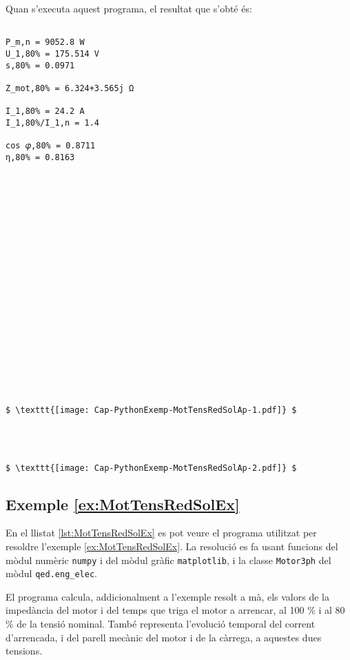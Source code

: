 Quan s'executa aquest programa, el resultat que s'obté és:
\lstset{
	language=,
	numbers=none,
	frame=none
}
\begin{lstlisting}[mathescape=true]
	
P_m,n = 9052.8 W
U_1,80% = 175.514 V
s,80% = 0.0971

Z_mot,80% = 6.324+3.565j Ω

I_1,80% = 24.2 A
I_1,80%/I_1,n = 1.4

cos 𝜑,80% = 0.8711
η,80% = 0.8163
	
	
	
	
	
	
	

	
	
	
	
	
	
	
	
	
	
	
	
	
$ \texttt{[image: Cap-PythonExemp-MotTensRedSolAp-1.pdf]} $




$ \texttt{[image: Cap-PythonExemp-MotTensRedSolAp-2.pdf]} $
\end{lstlisting} 



\hypertarget{exemple:MotTensRedSolEx}{\subsection{Exemple \ref*{ex:MotTensRedSolEx} \MotTensRedSolEx}}
En el llistat \vref{lst:MotTensRedSolEx} es pot veure el programa utilitzat per resoldre l'exemple \vref{ex:MotTensRedSolEx}. La resolució es fa usant funcions del mòdul numèric \texttt{numpy} i del mòdul gràfic \texttt{matplotlib},  i la classe \texttt{Motor3ph} del mòdul \texttt{qed.eng\_elec}.


El programa calcula, addicionalment a l'exemple resolt a mà, els valors de la impedància del motor i  del temps que triga el motor a arrencar, al 100 \% i al 80 \% de la tensió nominal. També  representa l'evolució temporal del  corrent d'arrencada, i del parell mecànic del motor i de la càrrega, a aquestes dues tensions.

